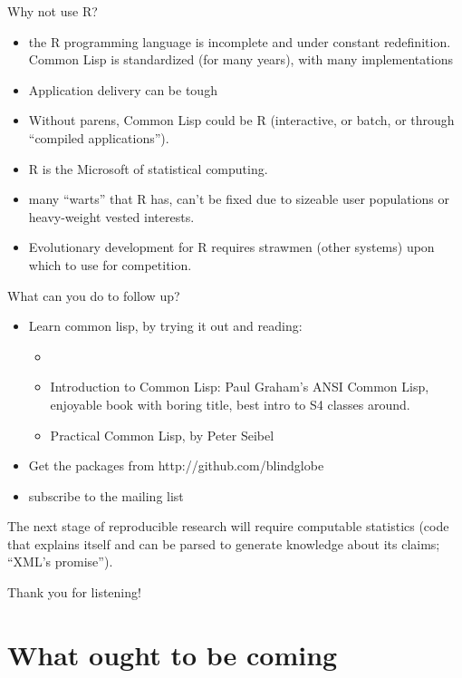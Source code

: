 \documentclass{beamer}
\begin{document}
\begin{frame}{Why not use R?}
  \begin{itemize}
  \item the R programming language is incomplete and under constant
    redefinition.  Common Lisp is standardized (for many years), with
    many implementations
  \item Application delivery can be tough
  \item Without parens, Common Lisp could be R (interactive, or batch,
    or through ``compiled applications'').
  \item R is the Microsoft of statistical computing.
  \item many ``warts'' that R has, can't be fixed due to sizeable user
    populations or heavy-weight vested interests.
  \item Evolutionary development for R requires strawmen (other
    systems) upon which to use for competition.
\end{itemize}

\end{frame}

\begin{frame}{What can you do to follow up?}
  \begin{itemize}
  \item Learn common lisp, by trying it out and reading:
    \begin{itemize}
    \item \item Introduction to Common Lisp: Paul Graham's ANSI Common
      Lisp, enjoyable book with boring title, best intro to S4 classes
      around.
    \item Practical Common Lisp, by Peter Seibel
    \end{itemize}
  \item Get the packages from  http://github.com/blindglobe
  \item subscribe to the mailing list
  \end{itemize}
  The next stage of reproducible research will require computable
  statistics (code that explains itself and can be parsed to generate
  knowledge about its claims; ``XML's promise'').
\end{frame}

\begin{frame}{Thank you for listening!}
  
\end{frame}

\section{What ought to be coming}
\end{document}
